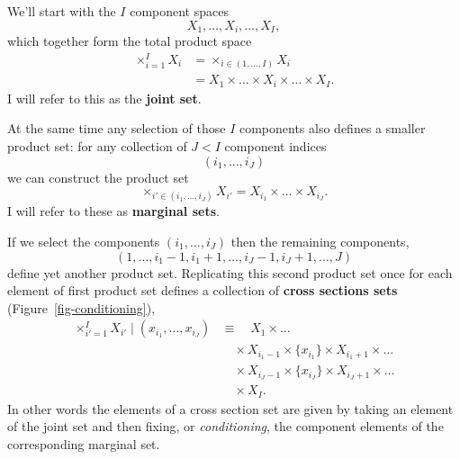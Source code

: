 \documentclass[
  letterpaper,
  DIV=11,
  numbers=noendperiod]{scrartcl}
\begin{document}
We'll start with the \(I\) component spaces \[
X_{1}, \ldots, X_{i}, \ldots, X_{I},
\] which together form the total product space \begin{align*}
\times_{i = 1}^{I} X_{i}
&= \times_{i \in (1, \ldots, I )} X_{i}
\\
&= X_{1} \times \ldots \times X_{i} \times \ldots \times X_{I}.
\end{align*} I will refer to this as the \textbf{joint set}.

At the same time any selection of those \(I\) components also defines a
smaller product set: for any collection of \(J < I\) component indices
\[
( i_{1}, \ldots, i_{J} )
\] we can construct the product set \[
\times_{ i' \in ( i_{1}, \ldots, i_{J} ) } X_{i'}
=
X_{i_{1}} \times \ldots \times X_{i_{J}}.
\] I will refer to these as \textbf{marginal sets}.

If we select the components \(( i_{1}, \ldots, i_{J} )\) then the
remaining components, \[
( 1, \ldots, i_{1} - 1, i_{1} + 1, \ldots, i_{J} - 1, i_{J} + 1, \ldots, J )
\] define yet another product set. Replicating this second product set
once for each element of first product set defines a collection of
\textbf{cross sections sets} (Figure~\ref{fig-conditioning}),
\begin{align*}
\times_{i' = 1}^{I} X_{i'} \mid (x_{i_{1}}, \ldots, x_{i_{J}})
&\equiv \quad
X_{1} \times \ldots
\\
&\quad \times
X_{i_{1} - 1} \times \{ x_{i_{1}} \} \times X_{i_{1} + 1} \times \ldots
\\
&\quad \times
X_{i_{J} - 1} \times \{ x_{i_{J}} \} \times X_{i_{J} + 1} \times \ldots
\\
&\quad \times X_{I}.
\end{align*} In other words the elements of a cross section set are
given by taking an element of the joint set and then fixing, or
\emph{conditioning}, the component elements of the corresponding
marginal set.
\end{document}

